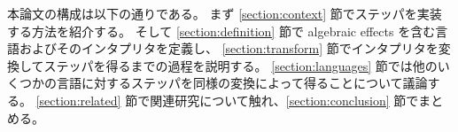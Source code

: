 本論文の構成は以下の通りである。
まず \ref{section:context} 節でステッパを実装する方法を紹介する。
そして \ref{section:definition} 節で algebraic effects を含む言語およびそのインタプリタを定義し、
\ref{section:transform} 節でインタプリタを変換してステッパを得るまでの過程を説明する。
\ref{section:languages} 節では他のいくつかの言語に対するステッパを同様の変換によって得ることについて議論する。
\ref{section:related} 節で関連研究について触れ、\ref{section:conclusion} 節でまとめる。




%
%

